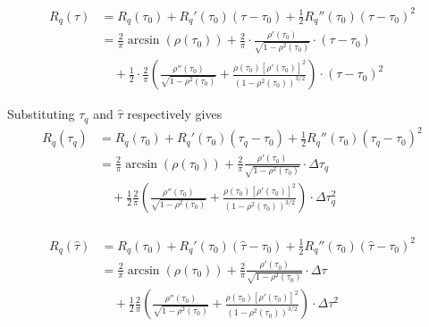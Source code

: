 \documentclass{article}
\begin{document}
\begin{itemize}
		\begin{equation}
			\begin{aligned}
				R_q(\tau) &= R_q(\tau_0) + R_q'(\tau_0)(\tau - \tau_0) + \frac{1}{2} R_q''(\tau_0)(\tau - \tau_0)^2  \\
				&= \frac{2}{\pi} \arcsin(\rho(\tau_0)) + \frac{2}{\pi} \cdot \frac{\rho'(\tau_0)}{\sqrt{1 - \rho^2(\tau_0)}} \cdot (\tau - \tau_0)  \\
				&\quad + \frac{1}{2} \cdot \frac{2}{\pi} \left( \frac{\rho''(\tau_0)}{\sqrt{1 - \rho^2(\tau_0)}} + \frac{\rho(\tau_0)[\rho'(\tau_0)]^2}{(1 - \rho^2(\tau_0))^{3/2}} \right) \cdot (\tau - \tau_0)^2 
			\end{aligned}
		\end{equation}
		
		Substituting $\tau_q$ and $\hat{\tau}$ respectively gives
		\begin{equation}
			\begin{aligned}
				R_q(\tau_q) &= R_q(\tau_0) + R_q'(\tau_0)(\tau_q - \tau_0) + \frac{1}{2}R_q''(\tau_0)(\tau_q - \tau_0)^2  \\
				&= \frac{2}{\pi}\arcsin(\rho(\tau_0)) + \frac{2}{\pi}\frac{\rho'(\tau_0)}{\sqrt{1-\rho^2(\tau_0)}} \cdot \Delta\tau_q  \\
				&\quad + \frac{1}{2}\frac{2}{\pi}\left( \frac{\rho''(\tau_0)}{\sqrt{1-\rho^2(\tau_0)}} + \frac{\rho(\tau_0)[\rho'(\tau_0)]^2}{(1-\rho^2(\tau_0))^{3/2}} \right) \cdot \Delta\tau_q^2  \\
			\end{aligned}
		\end{equation}
		
		
		\begin{equation}
			\begin{aligned}
				R_q(\hat{\tau}) &= R_q(\tau_0) + R_q'(\tau_0)(\hat{\tau} - \tau_0) + \frac{1}{2}R_q''(\tau_0)(\hat{\tau} - \tau_0)^2  \\
				&= \frac{2}{\pi}\arcsin(\rho(\tau_0)) + \frac{2}{\pi}\frac{\rho'(\tau_0)}{\sqrt{1-\rho^2(\tau_0)}} \cdot \Delta\tau  \\
				&\quad + \frac{1}{2}\frac{2}{\pi}\left( \frac{\rho''(\tau_0)}{\sqrt{1-\rho^2(\tau_0)}} + \frac{\rho(\tau_0)[\rho'(\tau_0)]^2}{(1-\rho^2(\tau_0))^{3/2}} \right) \cdot \Delta\tau^2 
			\end{aligned}
		\end{equation}
	\end{itemize}
	
\end{document}
